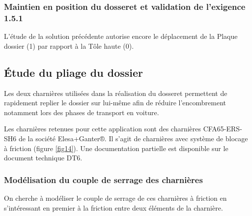 


\subsubsection{Maintien en position du dosseret et validation de l'exigence 1.5.1}

L'étude de la solution précédente autorise encore le déplacement de la Plaque dossier (1) par rapport à la Tôle haute (0).


\subsection{Étude du pliage du dossier}

Les deux charnières utilisées dans la réalisation du dosseret permettent de rapidement replier le dossier sur lui-même afin de réduire l'encombrement notamment lors des phases de transport en voiture.

Les charnières retenues pour cette application sont des charnières CFA65-ERS-SH6 de la société Elesa+Ganter®. Il s'agit de charnières avec système de blocage à friction (figure \ref{fig14}). Une documentation partielle est disponible sur le document technique DT6.

\subsubsection{Modélisation du couple de serrage des charnières}

On cherche à modéliser le couple de serrage de ces charnières à friction en s'intéressant en premier à la friction entre deux éléments de la charnière.

